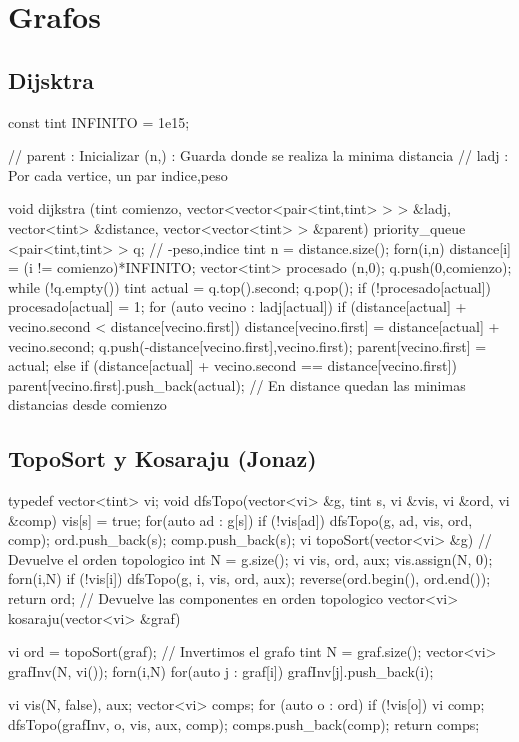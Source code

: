 \section{Grafos}

\subsection{Dijsktra}
\begin{code}
const tint INFINITO = 1e15;

// parent : Inicializar (n,{}) : Guarda donde se realiza la minima distancia
// ladj : Por cada vertice, un par {indice,peso}

void dijkstra (tint comienzo, vector<vector<pair<tint,tint> > > &ladj, 
vector<tint> &distance, vector<vector<tint> > &parent)
{
	priority_queue <pair<tint,tint> > q; // {-peso,indice}
	tint n = distance.size();
	forn(i,n)
		distance[i] = (i != comienzo)*INFINITO;
	vector<tint> procesado (n,0);
	q.push({0,comienzo});
	while (!q.empty())
	{
		tint actual = q.top().second;
		q.pop();
		if (!procesado[actual])
		{
			procesado[actual] = 1;
			for (auto vecino : ladj[actual])
			{
				if (distance[actual] + vecino.second < distance[vecino.first])
				{
					distance[vecino.first] = distance[actual] + vecino.second;
					q.push({-distance[vecino.first],vecino.first});
					parent[vecino.first] = {actual};
				}
				else if (distance[actual] + vecino.second == distance[vecino.first])
					parent[vecino.first].push_back(actual);
			}
		}
	}
}
// En distance quedan las minimas distancias desde comienzo
\end{code}

\subsection{TopoSort y Kosaraju (Jonaz)}
\begin{code}
typedef vector<tint> vi;
void dfsTopo(vector<vi> &g, tint s, vi &vis, vi &ord, vi &comp) {
	vis[s] = true;
	for(auto ad : g[s]) if (!vis[ad]) dfsTopo(g, ad, vis, ord, comp);
	ord.push_back(s);
	comp.push_back(s);
}
vi topoSort(vector<vi> &g) { // Devuelve el orden topologico
  int N = g.size();
  vi vis, ord, aux;
	vis.assign(N, 0);
	forn(i,N) if (!vis[i]) dfsTopo(g, i, vis, ord, aux);
	reverse(ord.begin(), ord.end());
  return ord;
}
// Devuelve las componentes en orden topologico
vector<vi> kosaraju(vector<vi> &graf) { 
	vi ord = topoSort(graf);
  // Invertimos el grafo
  tint N = graf.size();
  vector<vi> grafInv(N, vi());
  forn(i,N) for(auto j : graf[i]) grafInv[j].push_back(i);
  
  vi vis(N, false), aux;
  vector<vi> comps;
	for (auto o : ord)
  if (!vis[o]) {
    vi comp; dfsTopo(grafInv, o, vis, aux, comp);
    comps.push_back(comp);
  }
	return comps;
}
\end{code}

